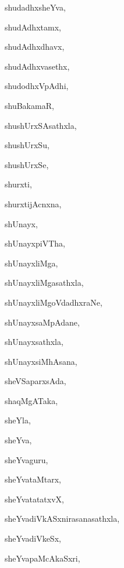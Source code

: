 \begin{multicols}{3}
{\noindent
{shudadhxsheYva}, \pageref{shudadhxsheYva}

\noindent
{shudAdhxtamx}, \pageref{shudAdhxtamx}

\noindent
{shudAdhxdhavx}, \pageref{shudAdhxdhavx}

\noindent
{shudAdhxvasethx}, \pageref{shudAdhxvasethx}

\noindent
{shudodhxVpAdhi}, \pageref{shudodhxVpAdhi}

\noindent
{shuBakamaR}, \pageref{shuBakamaR}

\noindent
{shushUrxSAsathxla}, \pageref{shushUrxSAsathxla}

\noindent
{shushUrxSu}, \pageref{shushUrxSu}

\noindent
{shushUrxSe}, \pageref{shushUrxSe}

\noindent
{shurxti}, \pageref{shurxti}

\noindent
{shurxtijAcnxna}, \pageref{shurxtijAcnxna}

\noindent
{shUnayx}, \pageref{shUnayx}

\noindent
{shUnayxpiVTha}, \pageref{shUnayxpiVTha}

\noindent
{shUnayxliMga}, \pageref{shUnayxliMga}

\noindent
{shUnayxliMgasathxla}, \pageref{shUnayxliMgasathxla}

\noindent
{shUnayxliMgoVdadhxraNe}, \pageref{shUnayxliMgoVdadhxraNe}

\noindent
{shUnayxsaMpAdane}, \pageref{shUnayxsaMpAdane}

\noindent
{shUnayxsathxla}, \pageref{shUnayxsathxla}

\noindent
{shUnayxsiMhAsana}, \pageref{shUnayxsiMhAsana}

\noindent
{sheVSaparxsAda}, \pageref{sheVSaparxsAda}

\noindent
{shaqMgATaka}, \pageref{shaqMgATaka}

\noindent
{sheYla}, \pageref{sheYla}

\noindent
{sheYva}, \pageref{sheYva}

\noindent
{sheYvaguru}, \pageref{sheYvaguru}

\noindent
{sheYvataMtarx}, \pageref{sheYvataMtarx}

\noindent
{sheYvatatatxvX}, \pageref{sheYvatatatxvX}

\noindent
{sheYvadiVkASxnirasanasathxla}, \pageref{sheYvadiVkASxnirasanasathxla}

\noindent
{sheYvadiVkeSx}, \pageref{sheYvadiVkeSx}

\noindent
{sheYvapaMcAkaSxri}, \pageref{sheYvapaMcAkaSxri}

}
\end{multicols}
